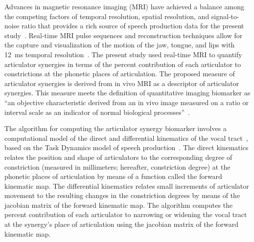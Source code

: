 \documentclass[preprint]{JASAnew}
\begin{document}
Advances in magnetic resonance imaging (MRI) have achieved a balance among the competing factors of temporal resolution, spatial resolution, and signal-to-noise ratio that provides a rich source of speech production data for the present study~\citep{scott2014speech}. Real-time MRI pulse sequences and reconstruction techniques allow for the capture and visualization of the motion of the jaw, tongue, and lips with \SI{12}{\milli\second} temporal resolution~\citep{toutios2016advances,lingala2016state}. 
%
The present study used real-time MRI to quantify articulator synergies in terms of the percent contribution of each articulator to constrictions at the phonetic places of articulation.
%
The proposed measure of articulator synergies is derived from in vivo MRI as a descriptor of articulator synergies. This measure meets the definition of quantitative imaging biomarker as ``an objective characteristic derived from an in vivo image measured on a ratio or interval scale as an indicator of normal biological processes''~\citep{kessler2015emerging,sullivan2015metrology}. 





The algorithm for computing the articulator synergy biomarker involves a computational model of the direct and differential kinematics of the vocal tract~\citep{lammert2013statistical}, based on the Task Dynamics model of speech production~\citep{saltzman1989dynamical}. 
%
The direct kinematics relates the position and shape of articulators to the corresponding degree of constriction (measured in millimeters; hereafter, constriction degree) at the phonetic places of articulation by means of a function called the forward kinematic map. 
%
The differential kinematics relates small increments of articulator movement to the resulting changes in the constriction degrees by means of the jacobian matrix of the forward kinematic map. 
%
The algorithm computes the percent contribution of each articulator to narrowing or widening the vocal tract at the synergy's place of articulation using the jacobian matrix of the forward kinematic map. 
\end{document}
